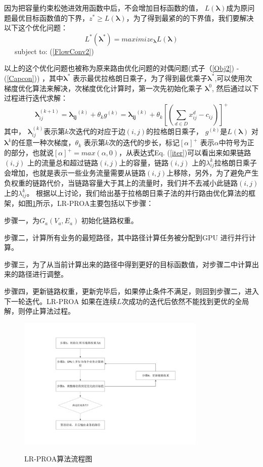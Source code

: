 因为把容量约束松弛进效用函数中后，不会增加目标函数的值， $L(\mathbf{\lambda})$成为原问题最优目标函数值的下界，$z^* \ge L(\mathbf{\lambda})$，为了得到最紧的的下界值，我们要解决以下这个优化问题：
\begin{equation}\label{dual}
L^*(\mathbf{\lambda^*}) = maximize_{\mathbf{\lambda}}L(\mathbf{\lambda})
\end{equation}
~~~subject to: (\ref{FlowConv2})
\vskip 0.2cm

以上的这个优化问题也被称为原来路由优化问题的对偶问题(式子（\ref{Obj2}) - (\ref{Capcon})) ，其中$\mathbf{\lambda^*}$ 表示最优拉格朗日乘子，为了得到最优乘子$\mathbf{\lambda^*}$,可以使用次梯度优化算法来解决，次梯度优化计算时，第一次先初始化乘子 $\mathbf{\lambda}^0$, 然后通过以下过程进行迭代求解：
\begin{equation}\label{iter}
\mathbf{\lambda}_{ij}^{(k+1)} =\mathbf{\lambda_{ij}}^{(k)}+\theta_{k} g^{(k)}= \mathbf{\lambda_{ij}}^{(k)} + \theta_k[(\sum\limits_{d \in D}x_{ij}^d - c_{ij})]^+
\end{equation}
其中， $\mathbf{\lambda}_{ij}^{(k)}$表示第$k$次迭代的对应于边$(i,j)$的拉格朗日乘子， $g^{(k)}$是$L(\mathbf{\lambda})$ 对$\mathbf{\lambda}^{k}$的任意一种次梯度，$\theta_k$ 表示第$k$次的迭代的步长，标记$[\alpha]^+$ 表示$\alpha$中符号为正的部分，也就说$[\alpha]^+=max(\alpha, 0)$，从表达式Eq. (\ref{iter})可以看出来如果链路$(i,j)$ 上的流量总和超过链路$(i,j)$上的容量，链路$(i,j)$ 上的$\lambda_{ij}^k$拉格朗日乘子会增加，也就是表示一些业务流量需要从链路$(i,j)$上移除，另外，为了避免产生负权重的链路代价，当链路容量大于其上的流量时，我们并不去减小此链路$(i,j)$上的$\lambda_{ij}^k$。
根据以上讨论，我们给出基于拉格朗日乘子法的并行路由优化算法的框架，如图\ref{lpl}所示，LR-PROA主要包括以下步骤：

步骤一，为$G_a(V_a, E_a)$ 初始化链路权重。

步骤二，计算所有业务的最短路径，其中路径计算任务被分配到GPU 进行并行计算。

步骤三，为了从当前计算出来的路径中得到更好的目标函数值，对步骤二中计算出来的路径进行调整。

步骤四，更新链路权重，更新完毕后，如果停止条件不满足，则回到步骤二，进入下一轮迭代。LR-PROA 如果在连续$L$次成功的迭代后依然不能找到更优的全局解，则停止算法过程。
\begin{figure}
\begin{center}
{\includegraphics[width=0.8\textwidth]{figures/lagrange.pdf}}
\end{center}
\caption{{\footnotesize{LR-PROA算法流程图}}}
\label{lpl}
\end{figure}
